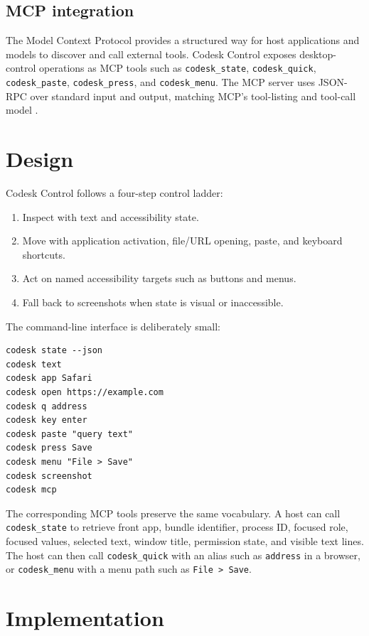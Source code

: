 \documentclass[11pt]{article}
\begin{document}
\subsection{MCP integration}

The Model Context Protocol provides a structured way for host applications and models to discover and call external tools. Codesk Control exposes desktop-control operations as MCP tools such as \texttt{codesk\_state}, \texttt{codesk\_quick}, \texttt{codesk\_paste}, \texttt{codesk\_press}, and \texttt{codesk\_menu}. The MCP server uses JSON-RPC over standard input and output, matching MCP's tool-listing and tool-call model \cite{mcp-tools,mcp-spec}.

\section{Design}

Codesk Control follows a four-step control ladder:

\begin{enumerate}
  \item Inspect with text and accessibility state.
  \item Move with application activation, file/URL opening, paste, and keyboard shortcuts.
  \item Act on named accessibility targets such as buttons and menus.
  \item Fall back to screenshots when state is visual or inaccessible.
\end{enumerate}

The command-line interface is deliberately small:

\begin{verbatim}
codesk state --json
codesk text
codesk app Safari
codesk open https://example.com
codesk q address
codesk key enter
codesk paste "query text"
codesk press Save
codesk menu "File > Save"
codesk screenshot
codesk mcp
\end{verbatim}

The corresponding MCP tools preserve the same vocabulary. A host can call \texttt{codesk\_state} to retrieve front app, bundle identifier, process ID, focused role, focused values, selected text, window title, permission state, and visible text lines. The host can then call \texttt{codesk\_quick} with an alias such as \texttt{address} in a browser, or \texttt{codesk\_menu} with a menu path such as \texttt{File > Save}.

\section{Implementation}
\end{document}
